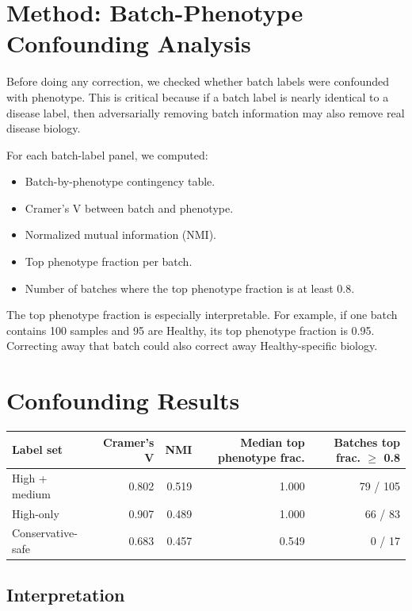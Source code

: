 \documentclass[11pt]{article}
\begin{document}
\section{Method: Batch-Phenotype Confounding Analysis}

Before doing any correction, we checked whether batch labels were confounded with
phenotype. This is critical because if a batch label is nearly identical to a disease label,
then adversarially removing batch information may also remove real disease biology.

For each batch-label panel, we computed:

\begin{itemize}
  \item Batch-by-phenotype contingency table.
  \item Cramer's V between batch and phenotype.
  \item Normalized mutual information (NMI).
  \item Top phenotype fraction per batch.
  \item Number of batches where the top phenotype fraction is at least 0.8.
\end{itemize}

The top phenotype fraction is especially interpretable. For example, if one batch contains
100 samples and 95 are Healthy, its top phenotype fraction is 0.95. Correcting away that
batch could also correct away Healthy-specific biology.

\section{Confounding Results}

\begin{center}
\begin{tabular}{lrrrr}
\toprule
Label set & Cramer's V & NMI & Median top phenotype frac. & Batches top frac. $\geq$ 0.8 \\
\midrule
High + medium & 0.802 & 0.519 & 1.000 & 79 / 105 \\
High-only & 0.907 & 0.489 & 1.000 & 66 / 83 \\
Conservative-safe & 0.683 & 0.457 & 0.549 & 0 / 17 \\
\bottomrule
\end{tabular}
\end{center}

\subsection{Interpretation}
\end{document}
